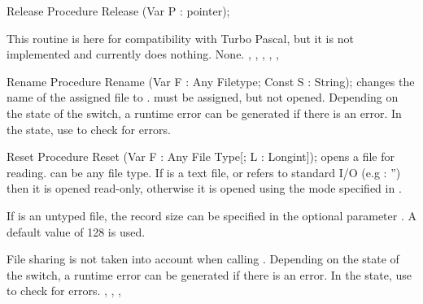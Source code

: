 
\begin{procedure}{Release}
\Declaration
Procedure Release (Var P : pointer);

\Description
This routine is here for compatibility with Turbo Pascal, but
it is not implemented and currently does nothing.
\Errors
None.
\SeeAlso
{}, , , , 
, 
\end{procedure}

\begin{procedure}{Rename}
\Declaration
Procedure Rename (Var F : Any Filetype; Const S : String);
\Description
{} changes the name of the assigned file  to .
must be assigned, but not opened.
\Errors
Depending on the state of the  switch, a runtime error can be 
generated if there is an error. In the  state, use 
to check for errors.
\SeeAlso
{}
\end{procedure}


\begin{procedure}{Reset}
\Declaration
Procedure Reset (Var F : Any File Type[; L : Longint]);
\Description
{} opens a file  for reading.  can be any file type.
If  is a text file, or refers to standard I/O (e.g : '') then it is 
opened read-only, otherwise it is opened using the mode specified in 
.

If  is an untyped file, the record size can be specified in
the optional parameter . A default value of 128 is used.

File sharing is not taken into account when calling .
\Errors
Depending on the state of the  switch, a runtime error can be 
generated if there is an error. In the  state, use 
to check for errors.
\SeeAlso
{}, , , 
\end{procedure}


